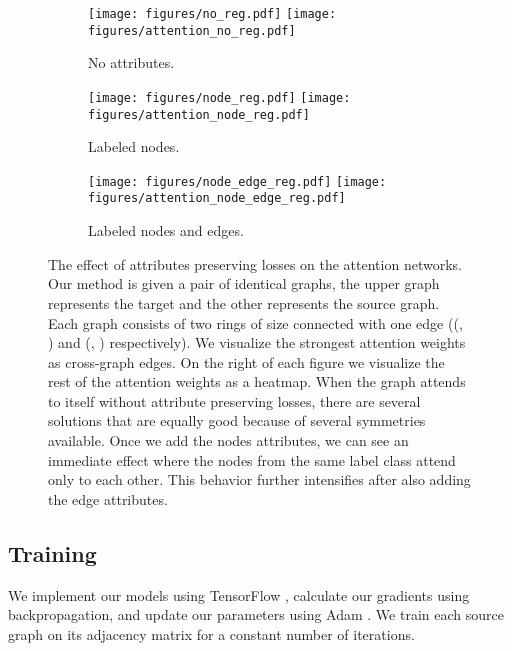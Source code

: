 \documentclass[sigconf]{acmart}
\begin{document}
\begin{figure*}[t]
    \begin{subfigure}[b]{0.33\textwidth}
        \texttt{[image: figures/no\_reg.pdf]} \texttt{[image: figures/attention\_no\_reg.pdf]}
        \caption{No attributes.}
        \label{fig:graph_no_reg}         
    \end{subfigure}
    \begin{subfigure}[b]{0.33\textwidth}
        \texttt{[image: figures/node\_reg.pdf]}
        \texttt{[image: figures/attention\_node\_reg.pdf]}
        \caption{Labeled nodes.}
        \label{fig:graph_node_reg}        
    \end{subfigure}
    \begin{subfigure}[b]{0.33\textwidth}
        \texttt{[image: figures/node\_edge\_reg.pdf]}  \texttt{[image: figures/attention\_node\_edge\_reg.pdf]}
        \caption{Labeled nodes and edges.}
        \label{fig:graph_edge_node_reg}        
    \end{subfigure}
    \caption{The effect of attributes preserving losses on the attention networks.
    Our method is given a pair of identical graphs, the upper graph represents the target and the other represents the source graph.
    Each graph consists of two rings of size  connected with one edge ((, ) and (, ) respectively).
    We visualize the strongest attention weights as cross-graph edges.
    On the right of each figure we visualize the rest of the attention weights as a heatmap.
    When the graph attends to itself without attribute preserving losses, there are several solutions that are equally good because of several symmetries available.
    Once we add the nodes attributes, we can see an immediate effect where the nodes from the same label class attend only to each other. This behavior further intensifies after also adding the edge attributes.
    }
    \label{fig:attention_viz}     
\end{figure*}

\subsection{Training}
\label{sec:training}
We implement our models using TensorFlow \cite{tensorflow},
calculate our gradients using backpropagation, and update our parameters using Adam \cite{kingma2014adam}.
We train each source graph on its adjacency matrix for a constant number of iterations.
\end{document}
